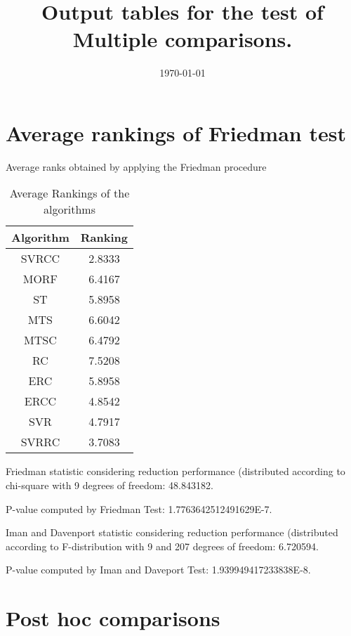 \documentclass[a4paper,10pt]{article}
\title{Output tables for the test of Multiple comparisons.}
\author{}
\date{\today}
\begin{document}
\begin{landscape}
\pagestyle{empty}
\maketitle
\thispagestyle{empty}
\section{Average rankings of Friedman test}



Average ranks obtained by applying the Friedman procedure

\begin{table}[!htp]
\centering
\begin{tabular}{|c|c|}\hline
Algorithm&Ranking\\\hline
SVRCC & 2.8333\\
MORF & 6.4167\\
ST & 5.8958\\
MTS & 6.6042\\
MTSC & 6.4792\\
RC & 7.5208\\
ERC & 5.8958\\
ERCC & 4.8542\\
SVR & 4.7917\\
SVRRC & 3.7083\\
\hline
\end{tabular}
\caption{Average Rankings of the algorithms}
\end{table}

Friedman statistic considering reduction performance (distributed according to chi-square with 9 degrees of freedom: 48.843182.

P-value computed by Friedman Test: 1.7763642512491629E-7.\newline

Iman and Davenport statistic considering reduction performance (distributed according to F-distribution with 9 and 207 degrees of freedom: 6.720594.

P-value computed by Iman and Daveport Test: 1.939949417233838E-8.\newline



\pagebreak

\section{Post hoc comparisons}


\end{landscape}
\end{document}
